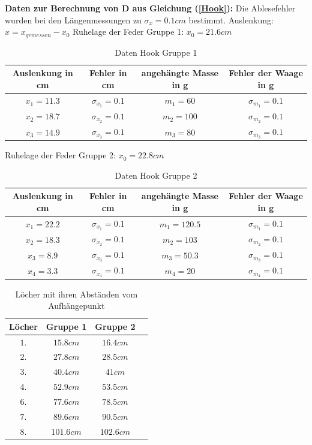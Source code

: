 \documentclass[12pt,a4paper]{article}
\begin{document}
\textbf{Daten zur Berechnung von D aus Gleichung (\ref{Hook}):}\newline
Die Ablesefehler wurden bei den Längenmessungen zu $\sigma_x=0.1cm$ bestimmt.\newline
Auslenkung: $x=x_{gemessen}-x_0$ \newline
Ruhelage der Feder Gruppe 1: $x_0=21.6cm$
\begin{table}[H]\centering
\caption{Daten Hook Gruppe 1}
\begin{tabular}{c|c|c|c}
Auslenkung in cm & Fehler in cm & angehängte Masse in g & Fehler der Waage in g\\ 
\hline
$x_1=11.3$& $\sigma_{x_1}=0.1$& $m_1=60$& $\sigma_{m_1}=0.1$\\ 
$x_2=18.7$& $\sigma_{x_2}=0.1$& $m_2=100$& $\sigma_{m_2}=0.1$\\
$x_3=14.9$& $\sigma_{x_3}=0.1$& $m_3=80$& $\sigma_{m_3}=0.1$\\
\end{tabular} 
\end{table}
Ruhelage der Feder Gruppe 2: $x_0=22.8cm$
\begin{table}[H]\centering
\caption{Daten Hook Gruppe 2}
\begin{tabular}{c|c|c|c}
Auslenkung in cm & Fehler in cm & angehängte Masse in g & Fehler der Waage in g\\ 
\hline
$x_1=22.2$& $\sigma_{x_1}=0.1$& $m_1=120.5$& $\sigma_{m_1}=0.1$\\ 
$x_2=18.3$& $\sigma_{x_2}=0.1$& $m_2=103$& $\sigma_{m_2}=0.1$\\
$x_3=8.9$& $\sigma_{x_3}=0.1$& $m_3=50.3$& $\sigma_{m_3}=0.1$\\
$x_4=3.3$& $\sigma_{x_4}=0.1$& $m_4=20$& $\sigma_{m_4}=0.1$\\
\end{tabular} 
\end{table}
\begin{table}[H]\centering
\caption{Löcher mit ihren Abständen vom Aufhängepunkt}
\begin{tabular}{c|c|c|c}
Löcher &Gruppe 1&Gruppe 2\\ 
\hline
$1.$& $15.8cm$& $16.4cm$\\ 
$2.$& $27.8cm$& $28.5cm$\\
$3.$& $40.4cm$& $41cm$\\
$4.$& $52.9cm$& $53.5cm$\\
$6.$& $77.6cm$& $78.5cm$\\ 
$7.$& $89.6cm$& $90.5cm$\\
$8.$& $101.6cm$& $102.6cm$\\
\end{tabular} 
\end{table}
\newpage
\end{document}
